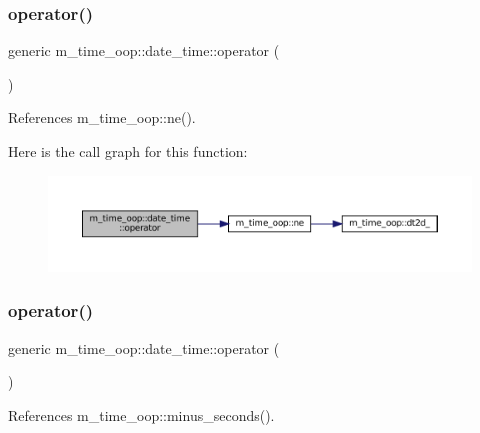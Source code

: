 \subsubsection{\texorpdfstring{operator()}{operator()}\hspace{0.1cm}{\footnotesize\ttfamily [7/9]}}
{\footnotesize\ttfamily generic m\+\_\+time\+\_\+oop\+::date\+\_\+time\+::operator (\begin{DoxyParamCaption}{ }\end{DoxyParamCaption})\hspace{0.3cm}{\ttfamily [private]}}



References m\+\_\+time\+\_\+oop\+::ne().

Here is the call graph for this function\+:\nopagebreak
\begin{figure}[H]
\begin{center}
\leavevmode
\includegraphics[width=350pt]{structm__time__oop_1_1date__time_ab7cce18fa0856dab47620629af1eda32_cgraph}
\end{center}
\end{figure}
\mbox{\label{structm__time__oop_1_1date__time_a1bc7a5d0ab4bd7539e7ec7bafd6dc572}} 
\subsubsection{\texorpdfstring{operator()}{operator()}\hspace{0.1cm}{\footnotesize\ttfamily [8/9]}}
{\footnotesize\ttfamily generic m\+\_\+time\+\_\+oop\+::date\+\_\+time\+::operator (\begin{DoxyParamCaption}{ }\end{DoxyParamCaption})\hspace{0.3cm}{\ttfamily [private]}}



References m\+\_\+time\+\_\+oop\+::minus\+\_\+seconds().

